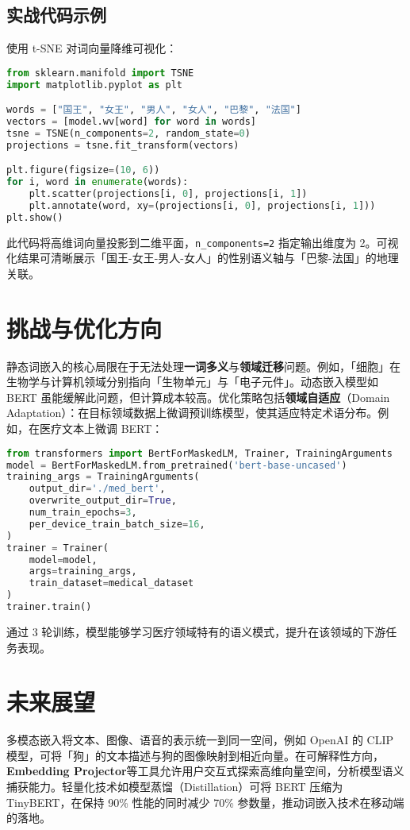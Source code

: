 \section{实战代码示例}
使用 t-SNE 对词向量降维可视化：\par
\begin{lstlisting}[language=python]
from sklearn.manifold import TSNE
import matplotlib.pyplot as plt

words = ["国王", "女王", "男人", "女人", "巴黎", "法国"]
vectors = [model.wv[word] for word in words]
tsne = TSNE(n_components=2, random_state=0)
projections = tsne.fit_transform(vectors)

plt.figure(figsize=(10, 6))
for i, word in enumerate(words):
    plt.scatter(projections[i, 0], projections[i, 1])
    plt.annotate(word, xy=(projections[i, 0], projections[i, 1]))
plt.show()
\end{lstlisting}
此代码将高维词向量投影到二维平面，\verb!n_components=2! 指定输出维度为 2。可视化结果可清晰展示「国王-女王-男人-女人」的性别语义轴与「巴黎-法国」的地理关联。\par
\chapter{挑战与优化方向}
静态词嵌入的核心局限在于无法处理\textbf{一词多义}与\textbf{领域迁移}问题。例如，「细胞」在生物学与计算机领域分别指向「生物单元」与「电子元件」。动态嵌入模型如 BERT 虽能缓解此问题，但计算成本较高。优化策略包括\textbf{领域自适应}（Domain Adaptation）：在目标领域数据上微调预训练模型，使其适应特定术语分布。例如，在医疗文本上微调 BERT：\par
\begin{lstlisting}[language=python]
from transformers import BertForMaskedLM, Trainer, TrainingArguments
model = BertForMaskedLM.from_pretrained('bert-base-uncased')
training_args = TrainingArguments(
    output_dir='./med_bert',
    overwrite_output_dir=True,
    num_train_epochs=3,
    per_device_train_batch_size=16,
)
trainer = Trainer(
    model=model,
    args=training_args,
    train_dataset=medical_dataset
)
trainer.train()
\end{lstlisting}
通过 3 轮训练，模型能够学习医疗领域特有的语义模式，提升在该领域的下游任务表现。\par
\chapter{未来展望}
多模态嵌入将文本、图像、语音的表示统一到同一空间，例如 OpenAI 的 CLIP 模型，可将「狗」的文本描述与狗的图像映射到相近向量。在可解释性方向，\textbf{Embedding Projector}等工具允许用户交互式探索高维向量空间，分析模型语义捕获能力。轻量化技术如模型蒸馏（Distillation）可将 BERT 压缩为 TinyBERT，在保持 90\%{} 性能的同时减少 70\%{} 参数量，推动词嵌入技术在移动端的落地。\par
